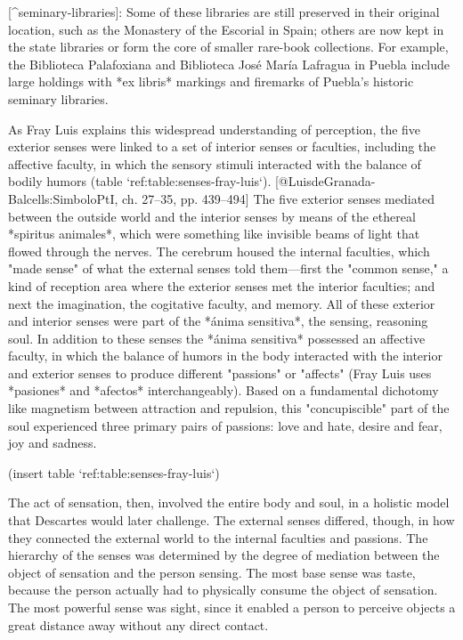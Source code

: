 [^seminary-libraries]:
Some of these libraries are still preserved in their original location, such as
the Monastery of the Escorial in Spain; others are now kept in the state
libraries or form the core of smaller rare-book collections.
For example, the Biblioteca Palafoxiana and Biblioteca José María Lafragua in
Puebla include large holdings with *ex libris* markings and firemarks of
Puebla's historic seminary libraries.


As Fray Luis explains this widespread understanding of perception, the five
exterior senses were linked to a set of interior senses or faculties, including
the affective faculty, in which the sensory stimuli interacted with the balance
of bodily humors (table `ref:table:senses-fray-luis`).
[@LuisdeGranada-Balcells:SimboloPtI, ch. 27--35, pp. 439--494]
The five exterior senses mediated between the outside world and the interior
senses by means of the ethereal *spiritus animales*, which were something like
invisible beams of light that flowed through the nerves. 
The cerebrum housed the internal faculties, which "made sense" of what the
external senses told them---first the "common sense," a kind of reception area
where the exterior senses met the interior faculties; and next the imagination,
the cogitative faculty, and memory. 
All of these exterior and interior senses were part of the *ánima sensitiva*,
the sensing, reasoning soul. 
In addition to these senses the *ánima sensitiva* possessed an affective
faculty, in which the balance of humors in the body interacted with the interior
and exterior senses to produce different "passions" or "affects" (Fray Luis uses
*pasiones* and *afectos* interchangeably). 
Based on a fundamental dichotomy like magnetism between attraction and
repulsion, this "concupiscible" part of the soul experienced three primary pairs
of passions: love and hate, desire and fear, joy and sadness. 

(insert table `ref:table:senses-fray-luis`)
\label{table:senses-fray-luis}

The act of sensation, then, involved the entire body and soul, in a
holistic model that Descartes would later challenge.
The external senses differed, though, in how they connected the external world
to the internal faculties and passions. 
The hierarchy of the senses was determined by the degree of mediation between
the object of sensation and the person sensing. 
The most base sense was taste, because the person actually had to physically
consume the object of sensation.
The most powerful sense was sight, since it enabled a person to perceive objects
a great distance away without any direct contact. 

